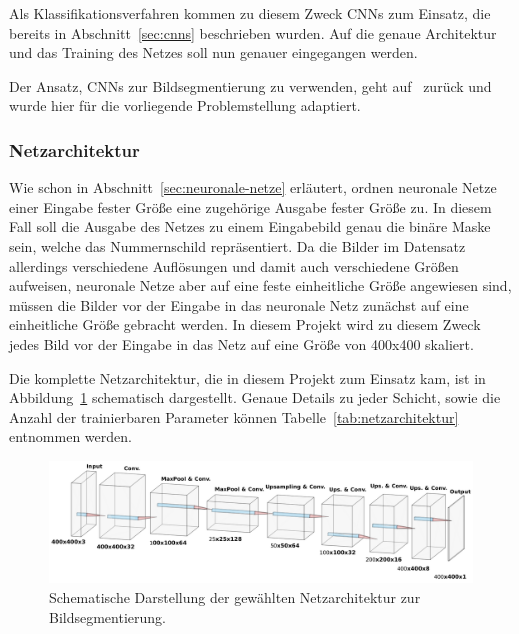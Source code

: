 Als Klassifikationsverfahren kommen zu diesem Zweck CNNs zum Einsatz,
die bereits in Abschnitt~\ref{sec:cnns} beschrieben wurden.
Auf die genaue Architektur und das Training des Netzes soll nun genauer
eingegangen werden.

Der Ansatz, CNNs zur Bildsegmentierung zu verwenden, geht
auf~\cite{image-segmentation} zur\"uck und wurde hier f\"ur die
vorliegende Problemstellung adaptiert.

\subsubsection{Netzarchitektur}

Wie schon in Abschnitt~\ref{sec:neuronale-netze} erl\"autert, ordnen
neuronale Netze einer Eingabe fester Gr\"o{\ss}e eine zugeh\"orige
Ausgabe fester Gr\"o{\ss}e zu.
In diesem Fall soll die Ausgabe des Netzes zu einem Eingabebild
genau die bin\"are Maske sein, welche das Nummernschild repr\"asentiert.
Da die Bilder im Datensatz allerdings verschiedene Aufl\"osungen
und damit auch verschiedene Gr\"o{\ss}en aufweisen, neuronale Netze
aber auf eine feste einheitliche Gr\"o{\ss}e angewiesen sind,
m\"ussen die Bilder vor der Eingabe in das neuronale Netz
zun\"achst auf eine einheitliche Gr\"o{\ss}e gebracht werden.
In diesem Projekt wird zu diesem Zweck jedes Bild vor der Eingabe
in das Netz auf eine Gr\"o{\ss}e von 400x400 skaliert.

Die komplette Netzarchitektur, die in diesem Projekt zum Einsatz kam,
ist in Abbildung~\ref{fig:netzarchitektur} schematisch dargestellt.
Genaue Details zu jeder Schicht, sowie die Anzahl der trainierbaren
Parameter k\"onnen Tabelle~\ref{tab:netzarchitektur} entnommen werden.

\begin{figure}
    \centering
    \includegraphics[width=\textwidth]{abbildungen/network_architecture}
    \caption{Schematische Darstellung der gew\"ahlten Netzarchitektur
        zur Bildsegmentierung.}
    \label{fig:netzarchitektur}
\end{figure}


